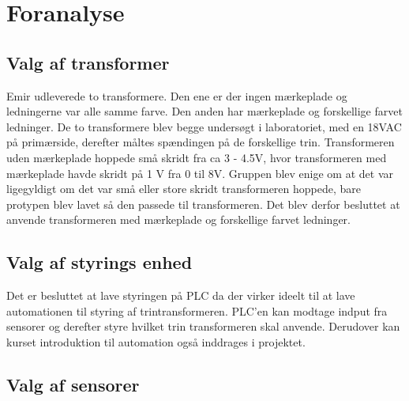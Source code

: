 
\chapter{Foranalyse}

\section{Valg af transformer}
Emir udleverede to transformere. Den ene er der ingen mærkeplade og ledningerne var alle samme farve. Den anden har mærkeplade og forskellige farvet ledninger. De to transformere blev begge undersøgt i laboratoriet, med en 18VAC på primærside, derefter måltes spændingen på de forskellige trin. Transformeren uden mærkeplade hoppede små skridt fra ca 3 - 4.5V, hvor transformeren med mærkeplade havde skridt på 1 V fra 0 til 8V. Gruppen blev enige om at det var ligegyldigt om det var små eller store skridt transformeren hoppede, bare protypen blev lavet så den passede til transformeren. Det blev derfor besluttet at anvende transformeren med mærkeplade og forskellige farvet ledninger. 

\section{Valg af styrings enhed}
Det er besluttet at lave styringen på PLC da der virker ideelt til at lave automationen til styring af trintransformeren. PLC'en kan modtage indput fra sensorer og derefter styre hvilket trin transformeren skal anvende. Derudover kan kurset introduktion til automation også inddrages i projektet.

\section{Valg af sensorer}

